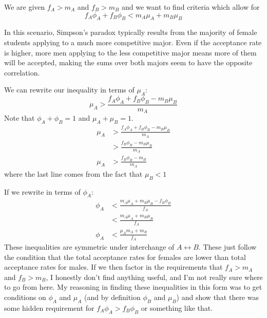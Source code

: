 \documentclass[a4paper,twoside]{article}
\begin{document}
\begin{problem}
    We are given $ f_A > m_A $ and $ f_B > m_B $ and we want to find criteria which allow for
    \begin{equation}
        f_A \phi_A + f_B \phi_B < m_A \mu_A + m_B \mu_B
    \end{equation}

    In this scenario, Simpson's paradox typically results from the majority of female students applying to a much more competitive major. Even if the acceptance rate is higher, more men applying to the less competitive major means more of them will be accepted, making the sums over both majors seem to have the opposite correlation.

    We can rewrite our inequality in terms of $ \mu_A $:
    \begin{equation}
        \mu_A > \frac{f_A\phi_A + f_B\phi_B - m_B \mu_B}{m_A}
    \end{equation}
    Note that $ \phi_A + \phi_B = 1 $ and $ \mu_A + \mu_B = 1 $.
    \begin{align}
        \mu_A &> \frac{f_A\phi_A + f_B\phi_B - m_B \mu_B}{m_A} \\
        &> \frac{f_B\phi_B - m_B \mu_B}{m_A} \\
        \mu_A &> \frac{f_B\phi_B - m_B}{m_A}
    \end{align}
    where the last line comes from the fact that $ \mu_B < 1 $
    
    If we rewrite in terms of $ \phi_A $:
    \begin{align}
        \phi_A &< \frac{m_A \mu_A + m_B \mu_B - f_B \phi_B}{f_A} \\
        &< \frac{m_A \mu_A + m_B \mu_B}{f_A} \\
        \phi_A &< \frac{\mu_A m_A + m_B}{f_A}
    \end{align}
    These inequalities are symmetric under interchange of $ A \leftrightarrow B $. These just follow the condition that the total acceptance rates for females are lower than total acceptance rates for males. If we then factor in the requirements that $ f_A > m_A $ and $ f_B > m_B $, I honestly don't find anything useful, and I'm not really sure where to go from here. My reasoning in finding these inequalities in this form was to get conditions on $ \phi_A $ and $ \mu_A $ (and by definition $ \phi_B $ and $ \mu_B $) and show that there was some hidden requirement for $ f_A \phi_A > f_B \phi_B $ or something like that.
\end{problem}
\end{document}
